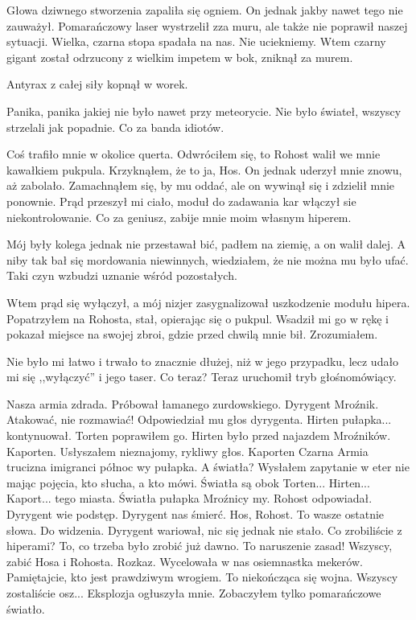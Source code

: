 Głowa dziwnego stworzenia zapaliła się ogniem.
On jednak jakby nawet tego nie zauważył.
Pomarańczowy laser wystrzelił zza muru, ale także nie poprawił naszej sytuacji.
Wielka, czarna stopa spadała na nas.
Nie uciekniemy.
Wtem czarny gigant został odrzucony z wielkim impetem w bok, zniknął za murem.

\divider{}

Antyrax z całej siły kopnął w worek.

\divider{}

Panika, panika jakiej nie było nawet przy meteorycie.
Nie było świateł, wszyscy strzelali jak popadnie.
Co za banda idiotów.

Coś trafiło mnie w okolice querta.
Odwróciłem się, to Rohost walił we mnie kawałkiem pukpula.
Krzyknąłem, że to ja, Hos.
On jednak uderzył mnie znowu, aż zabolało.
Zamachnąłem się, by mu oddać, ale on wywinął się i zdzielił mnie ponownie.
Prąd przeszył mi ciało, moduł do zadawania kar włączył sie niekontrolowanie. 
Co za geniusz, zabije mnie moim własnym hiperem.

Mój były kolega jednak nie przestawał bić, padłem na ziemię, a on walił dalej.
A niby tak bał się mordowania niewinnych, wiedziałem, że nie można mu było ufać.
Taki czyn wzbudzi uznanie wśród pozostałych.

Wtem prąd się wyłączył, a mój nizjer zasygnalizował uszkodzenie modułu hipera.
Popatrzyłem na Rohosta, stał, opierając się o pukpul.
Wsadził mi go w rękę i pokazał miejsce na swojej zbroi, gdzie przed chwilą mnie bił.
Zrozumiałem.

Nie było mi łatwo i trwało to znacznie dłużej, niż w jego przypadku, lecz udało mi się ,,wyłączyć'' i jego taser.
Co teraz?
Teraz uruchomił tryb głośnomówiący.
\begin{dialogue}
\ds{} Nasza armia zdrada. \dm{} Próbował łamanego zurdowskiego. \dm{} Dyrygent Mroźnik.
\ds{} Atakować, nie rozmawiać! \dm{} Odpowiedział mu głos dyrygenta.
\ds{} Hirten pułapka... \dm{} kontynuował.
\ds{} Torten \dm{} poprawiłem go. \dm{} Hirten było przed najazdem Mroźników.
\ds{} Kaporten. \dm{} Usłyszałem nieznajomy, rykliwy głos. \dm{} Kaporten Czarna Armia trucizna imigranci północ wy pułapka.
\ds{} A światła? \dm{} Wysłałem zapytanie w eter nie mając pojęcia, kto słucha, a kto mówi. \dm{} Światła są obok Torten... Hirten... Kaport... tego miasta.
\ds{} Światła pułapka Mroźnicy my. \dm{} Rohost odpowiadał. \dm{} Dyrygent wie podstęp. Dyrygent nas śmierć.
\ds{} Hos, Rohost. To wasze ostatnie słowa. Do widzenia. \dm{} Dyrygent wariował, nic się jednak nie stało. \dm{} Co zrobiliście z hiperami?
\ds{} To, co trzeba było zrobić już dawno.
\ds{} To naruszenie zasad! Wszyscy, zabić Hosa i Rohosta. Rozkaz. \dm{} Wycelowała w nas osiemnastka mekerów.
\ds{} Pamiętajcie, kto jest prawdziwym wrogiem. To niekończąca się wojna. Wszyscy zostaliście osz... \dm{} Eksplozja ogłuszyła mnie. Zobaczyłem tylko pomarańczowe światło.
\end{dialogue}

